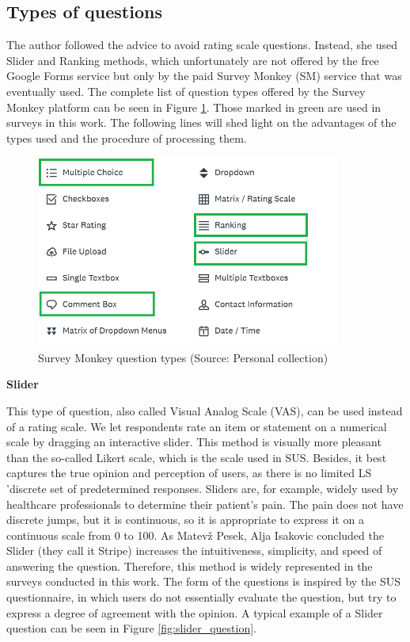 \documentclass[a4paper,10pt,twoside]{article}
\begin{document}
\subsection{Types of questions}

\noindent The author followed the advice to avoid rating scale questions. Instead, she used Slider and Ranking methods, which unfortunately are not offered by the free Google Forms service but only by the paid Survey Monkey (SM) service that was eventually used. The complete list of question types offered by the Survey Monkey platform can be seen in Figure \ref{fig:survey_monkey_options}. Those marked in green are used in surveys in this work. The following lines will shed light on the advantages of the types used and the procedure of processing them.

\vspace{0.3cm}
\begin{figure}[hbt!] 
\begin{center}
\includegraphics[width=10cm]{../pictures/survey_monkey_options.png} 
\caption[Survey Monkey answer types ]{Survey Monkey question types (Source: Personal collection)}
\label{fig:survey_monkey_options}
\end{center}
\end{figure}


\noindent \textbf {Slider}
\label{sec:slider}

\noindent This type of question, also called Visual Analog Scale (VAS), can be used instead of a rating scale. We let respondents rate an item or statement on a numerical scale by dragging an interactive slider. This method is visually more pleasant than the so-called Likert scale, which is the scale used in SUS. Besides, it best captures the true opinion and perception of users, as there is no limited LS 'discrete set of predetermined responses. Sliders are, for example, widely used by healthcare professionals to determine their patient's pain. The pain does not have discrete jumps, but it is continuous, so it is appropriate to express it on a continuous scale from 0 to 100. As Matevž Pesek, Alja Isakovic \cite{inproceedings} concluded the Slider (they call it Stripe) increases the intuitiveness, simplicity, and speed of answering the question. Therefore, this method is widely represented in the surveys conducted in this work. The form of the questions is inspired by the SUS questionnaire, in which users do not essentially evaluate the question, but try to express a degree of agreement with the opinion. A typical example of a Slider question can be seen in Figure \ref{fig:slider_question}.
\end{document}
